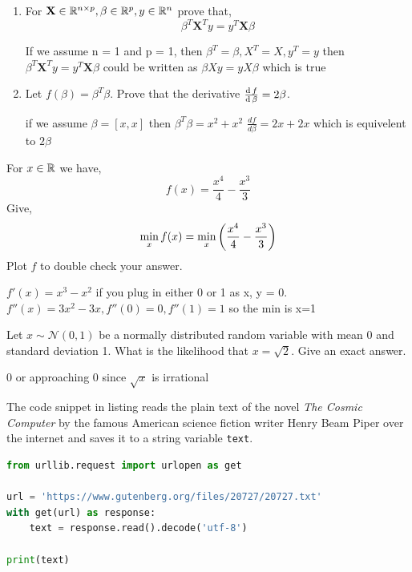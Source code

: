\documentclass{homework}
\begin{document}
\begin{enumerate}[label=(\alph*)]
  \item For $\mathbf{X} \in \mathbb{R}^{n\times p}, \beta \in \mathbb{R}^p, y \in \mathbb{R}^n$
        prove that,
        \[
          \beta^T\mathbf{X}^Ty = y^T\mathbf{X}\beta
        \]

        \begin{sol}
          If we assume n = 1 and p = 1, then $\beta^T = \beta, X^T = X, y^T = y$ then $\beta^T\mathbf{X}^Ty = y^T\mathbf{X}\beta$ could be written as $\beta X y = y X \beta$ which is true
        \end{sol}

  \item Let $f(\beta) = \beta^T\beta$. Prove that the derivative $\frac{\operatorname{d}
            f}{\operatorname{d} \beta} = 2\beta$.

            \begin{sol}
              if we assume $\beta = [x, x]$ then $\beta^T \beta = x^2 + x^2$ $\frac{df}{d\beta}= 2x + 2x$ which is equivelent to $2\beta$
            \end{sol}
\end{enumerate}
\question For $x \in \mathbb{R}$ we have,
\[
  f(x) = \frac{x^4}{4} - \frac{x^3}{3}
\]
Give,
\[
  \min_xf(x) = \min_x\left(\frac{x^4}{4} - \frac{x^3}{3}\right)
\]
Plot $f$ to double check your answer.

\begin{sol}
  $f'(x)=x^3 - x^2$ if you plug in either 0 or 1 as x, y = 0. $f''(x)=3x^2 -3x, f''(0)=0, f''(1)=1$ so the min is x=1
\end{sol}

\question Let $x \sim \mathcal{N}(0, 1)$ be a normally distributed random
variable with mean 0 and standard deviation 1. What is the
likelihood that $x=\sqrt{2}$. Give an exact answer.

\begin{sol}
  0 or approaching 0 since $\sqrt{x}$ is irrational
\end{sol}

\question The code snippet in listing %
reads the plain text of the
novel \textit{The Cosmic Computer} by the famous American science
fiction writer Henry Beam Piper over the internet and saves it to
a string variable \texttt{text}.

\begin{lstlisting}[language=python, label=read, caption={A Python program to download the text of the \textit{The Cosmic Computer} by Piper.}]
from urllib.request import urlopen as get

url = 'https://www.gutenberg.org/files/20727/20727.txt'
with get(url) as response:
    text = response.read().decode('utf-8')

print(text)
\end{lstlisting}
\end{document}
